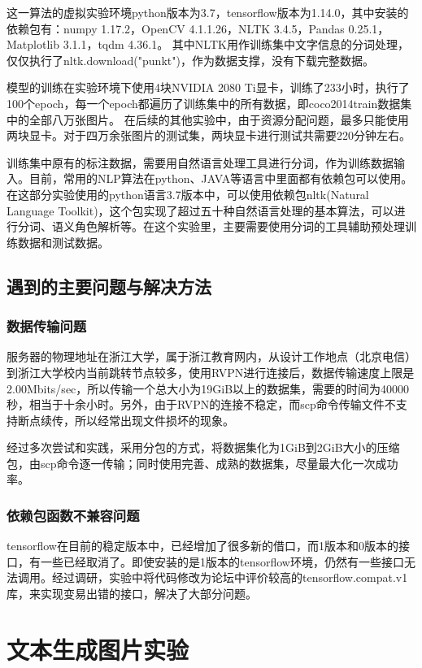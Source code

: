 这一算法的虚拟实验环境python版本为3.7，tensorflow版本为1.14.0，其中安装的依赖包有：numpy 1.17.2，OpenCV 4.1.1.26，NLTK 3.4.5，Pandas 0.25.1，Matplotlib 3.1.1，tqdm 4.36.1。
其中NLTK用作训练集中文字信息的分词处理，仅仅执行了nltk.download("punkt")，作为数据支撑，没有下载完整数据。

模型的训练在实验环境下使用4块NVIDIA 2080 Ti显卡，训练了233小时，执行了100个epoch，每一个epoch都遍历了训练集中的所有数据，即coco2014train数据集中的全部八万张图片。
在后续的其他实验中，由于资源分配问题，最多只能使用两块显卡。对于四万余张图片的测试集，两块显卡进行测试共需要220分钟左右。

训练集中原有的标注数据，需要用自然语言处理工具进行分词，作为训练数据输入。目前，常用的NLP算法在python、JAVA等语言中里面都有依赖包可以使用。
在这部分实验使用的python语言3.7版本中，可以使用依赖包nltk(Natural Language Toolkit)，这个包实现了超过五十种自然语言处理的基本算法，可以进行分词、语义角色解析等。在这个实验里，主要需要使用分词的工具辅助预处理训练数据和测试数据。

\subsection{遇到的主要问题与解决方法}
\subsubsection{数据传输问题}
服务器的物理地址在浙江大学，属于浙江教育网内，从设计工作地点（北京电信）到浙江大学校内当前跳转节点较多，使用RVPN进行连接后，数据传输速度上限是2.00Mbits/sec，所以传输一个总大小为19GiB以上的数据集，需要的时间为40000秒，相当于十余小时。另外，由于RVPN的连接不稳定，而scp命令传输文件不支持断点续传，所以经常出现文件损坏的现象。

经过多次尝试和实践，采用分包的方式，将数据集化为1GiB到2GiB大小的压缩包，由scp命令逐一传输；同时使用完善、成熟的数据集，尽量最大化一次成功率。

\subsubsection{依赖包函数不兼容问题}
tensorflow在目前的稳定版本中，已经增加了很多新的借口，而1版本和0版本的接口，有一些已经取消了。即使安装的是1版本的tensorflow环境，仍然有一些接口无法调用。经过调研，实验中将代码修改为论坛中评价较高的tensorflow.compat.v1库，来实现变易出错的接口，解决了大部分问题。

\section{文本生成图片实验}
